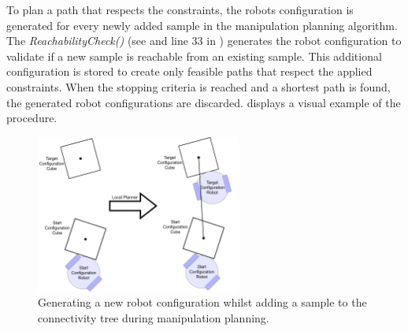 To plan a path that respects the constraints, the robots configuration is generated for every newly added sample in the manipulation planning algorithm. The \textit{ReachabilityCheck()} (see  and line 33 in ) generates the robot configuration to validate if a new sample is reachable from an existing sample. This additional configuration is stored to create only feasible paths that respect the applied constraints. When the stopping criteria is reached and a shortest path is found, the generated robot configurations are discarded.  displays a visual example of the procedure.\bs

\begin{figure}[H]
    \centering
    \includegraphics[width=0.6\textwidth]{figures/required_background/manipulation_local_planner}
    \caption{Generating a new robot configuration whilst adding a sample to the connectivity tree during manipulation planning.}%
    \label{fig:manipulation_plannig_local_planner}
\end{figure}

